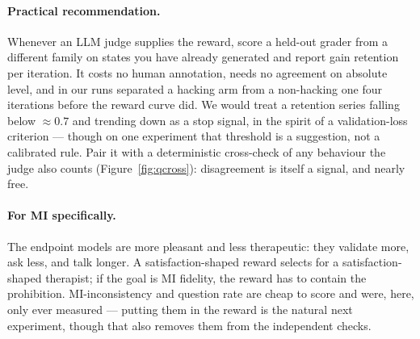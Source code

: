 \paragraph{Practical recommendation.} Whenever an LLM judge supplies the reward, score a
held-out grader from a different family on states you have already generated and report gain
retention per iteration. It costs no human annotation, needs no agreement on absolute level, and
in our runs separated a hacking arm from a non-hacking one four iterations before the reward
curve did. We would treat a retention series falling below ${\approx}0.7$ and trending down as a
stop signal, in the spirit of a validation-loss criterion --- though on one experiment that
threshold is a suggestion, not a calibrated rule. Pair it with a deterministic cross-check of
any behaviour the judge also counts (Figure~\ref{fig:qcross}): disagreement is itself a signal,
and nearly free.

\paragraph{For MI specifically.} The endpoint models are more pleasant and less therapeutic:
they validate more, ask less, and talk longer. A satisfaction-shaped reward selects for a
satisfaction-shaped therapist; if the goal is MI fidelity, the reward has to contain the
prohibition. MI-inconsistency and question rate are cheap to score and were, here, only ever
measured --- putting them in the reward is the natural next experiment, though that also
removes them from the independent checks.
